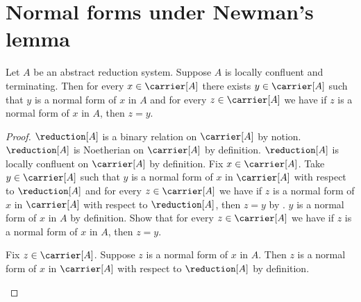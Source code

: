 



\section{Normal forms under Newman's lemma}

\begin{corollary}\label{newman_unique_normal_forms}
    Let $A$ be an abstract reduction system.
    Suppose $A$ is locally confluent and terminating.
    Then for every $x\in\carrier[A]$ there exists $y\in\carrier[A]$ such that
        $y$ is a normal form of $x$ in $A$ and
        for every $z\in\carrier[A]$ we have if
            $z$ is a normal form of $x$ in $A$, then $z=y$.
\end{corollary}
\begin{proof}
    $\reduction[A]$ is a binary relation on $\carrier[A]$ by notion.
    $\reduction[A]$ is Noetherian on $\carrier[A]$ by definition.
    $\reduction[A]$ is locally confluent on $\carrier[A]$ by definition.
    Fix $x\in\carrier[A]$.
    Take $y\in\carrier[A]$ such that
        $y$ is a normal form of $x$ in $\carrier[A]$ with respect to
        $\reduction[A]$ and for every $z\in\carrier[A]$ we have if
        $z$ is a normal form of $x$ in $\carrier[A]$ with respect to
        $\reduction[A]$, then $z=y$
        by .
    $y$ is a normal form of $x$ in $A$ by definition.
    Show that for every $z\in\carrier[A]$ we have if
        $z$ is a normal form of $x$ in $A$, then $z=y$.
    \begin{subproof}
        Fix $z\in\carrier[A]$.
        Suppose $z$ is a normal form of $x$ in $A$.
        Then $z$ is a normal form of $x$ in $\carrier[A]$ with respect to
            $\reduction[A]$ by definition.
    \end{subproof}
\end{proof}

